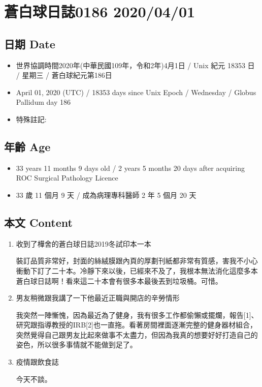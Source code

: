 \documentclass[
]{article}
\date{}
\providecommand{\tightlist}{%
  \setlength{\itemsep}{0pt}\setlength{\parskip}{0pt}}
\begin{document}
\hypertarget{ux84bcux767dux7403ux65e5ux8a8c0186-20200401}{%
\section{蒼白球日誌0186
2020/04/01}\label{ux84bcux767dux7403ux65e5ux8a8c0186-20200401}}

\hypertarget{ux65e5ux671f-date}{%
\subsection{日期 Date}\label{ux65e5ux671f-date}}

\begin{itemize}
\tightlist
\item
  世界協調時間2020年(中華民國109年，令和2年)4月1日 / Unix 紀元 18353 日
  / 星期三 / 蒼白球紀元第186日
\item
  April 01, 2020 (UTC) / 18353 days since Unix Epoch / Wednesday /
  Globus Pallidum day 186
\item
  特殊註記:
\end{itemize}

\hypertarget{ux5e74ux9f61-age}{%
\subsection{年齡 Age}\label{ux5e74ux9f61-age}}

\begin{itemize}
\tightlist
\item
  33 years 11 months 9 days old / 2 years 5 months 20 days after
  acquiring ROC Surgical Pathology Licence
\item
  33 歲 11 個月 9 天 / 成為病理專科醫師 2 年 5 個月 20 天
\end{itemize}

\hypertarget{ux672cux6587-content}{%
\subsection{本文 Content}\label{ux672cux6587-content}}

\begin{enumerate}
\def\labelenumi{\arabic{enumi}.}
\item
  收到了樺舍的蒼白球日誌2019冬試印本一本

  裝訂品質非常好，封面的絲絨膜跟內頁的厚劃刊紙都非常有質感，害我不小心衝動下訂了二十本。冷靜下來以後，已經來不及了，我根本無法消化這麼多本蒼白球日誌啊！看來這二十本會有很多本最後丟到垃圾桶。可惜。
\item
  男友稍微跟我講了一下他最近正職與開店的辛勞情形

  我突然一陣慚愧，因為最近為了健身，我有很多工作都偷懶或擺爛，報告{[}1{]}、研究跟指導教授的IRB{[}2{]}也一直拖。看著房間裡面逐漸完整的健身器材組合，突然覺得自己跟男友比起來做事不太盡力，但因為我真的想要好好打造自己的姿色，所以很多事情就不能做到足了。
\item
  疫情跟飲食誌

  今天不談。
\end{enumerate}
\end{document}
